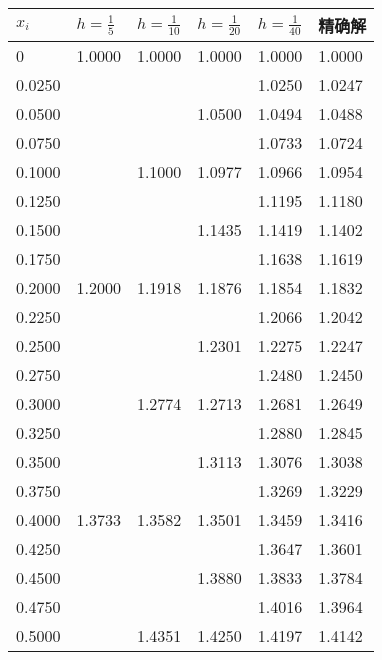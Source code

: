 \documentclass[12pt, a4paper, oneside]{ctexart}
\begin{document}
\begin{table}[h] %
    \centering
    \footnotesize
    \begin{minipage}[t]{0.48\textwidth}\centering
    \begin{tabular}{@{}llllll@{}}
        \toprule
        $x_i$      & $h=\frac{1}{5}$  & $h=\frac{1}{10}$ & $h=\frac{1}{20}$ & $h=\frac{1}{40}$ & 精确解    \\ \midrule
        0      & 1.0000 & 1.0000 & 1.0000 & 1.0000 & 1.0000 \\
        0.0250 &     &     &     & 1.0250 & 1.0247 \\
        0.0500 &     &     & 1.0500 & 1.0494 & 1.0488 \\
        0.0750 &     &     &     & 1.0733 & 1.0724 \\
        0.1000 &     & 1.1000 & 1.0977 & 1.0966 & 1.0954 \\
        0.1250 &     &     &     & 1.1195 & 1.1180 \\
        0.1500 &     &     & 1.1435 & 1.1419 & 1.1402 \\
        0.1750 &     &     &     & 1.1638 & 1.1619 \\
        0.2000 & 1.2000 & 1.1918 & 1.1876 & 1.1854 & 1.1832 \\
        0.2250 &     &     &     & 1.2066 & 1.2042 \\
        0.2500 &     &     & 1.2301 & 1.2275 & 1.2247 \\
        0.2750 &     &     &     & 1.2480 & 1.2450 \\
        0.3000 &     & 1.2774 & 1.2713 & 1.2681 & 1.2649 \\
        0.3250 &     &     &     & 1.2880 & 1.2845 \\
        0.3500 &     &     & 1.3113 & 1.3076 & 1.3038 \\
        0.3750 &     &     &     & 1.3269 & 1.3229 \\
        0.4000 & 1.3733 & 1.3582 & 1.3501 & 1.3459 & 1.3416 \\
        0.4250 &     &     &     & 1.3647 & 1.3601 \\
        0.4500 &     &     & 1.3880 & 1.3833 & 1.3784 \\
        0.4750 &     &     &     & 1.4016 & 1.3964 \\
        0.5000 &     & 1.4351 & 1.4250 & 1.4197 & 1.4142 \\ \bottomrule
        \end{tabular}
    \end{minipage}

\end{table}
\end{document}

